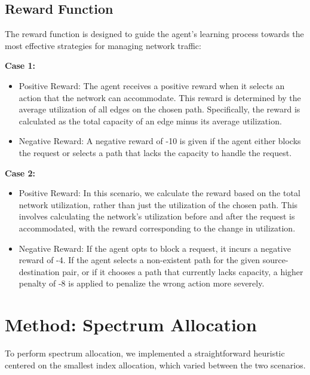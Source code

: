 \documentclass[conference]{IEEEtran}
\begin{document}
\subsection{Reward Function}
The reward function is designed to guide the agent's learning process towards the most effective strategies for managing network traffic:

\textbf{Case 1:}
\begin{itemize}
\item Positive Reward: The agent receives a positive reward when it selects an action that the network can accommodate. This reward is determined by the average utilization of all edges on the chosen path. Specifically, the reward is calculated as the total capacity of an edge minus its average utilization.

\item Negative Reward: A negative reward of -10 is given if the agent either blocks the request or selects a path that lacks the capacity to handle the request.
\end{itemize}

\textbf{Case 2:}
\begin{itemize}
\item Positive Reward: In this scenario, we calculate the reward based on the total network utilization, rather than just the utilization of the chosen path. This involves calculating the network's utilization before and after the request is accommodated, with the reward corresponding to the change in utilization.

\item Negative Reward: If the agent opts to block a request, it incurs a negative reward of -4. If the agent selects a non-existent path for the given source-destination pair, or if it chooses a path that currently lacks capacity, a higher penalty of -8 is applied to penalize the wrong action more severely.
\end{itemize}


\section{Method: Spectrum Allocation}


To perform spectrum allocation, we implemented a straightforward heuristic centered on the smallest index allocation, which varied between the two scenarios.
\end{document}
